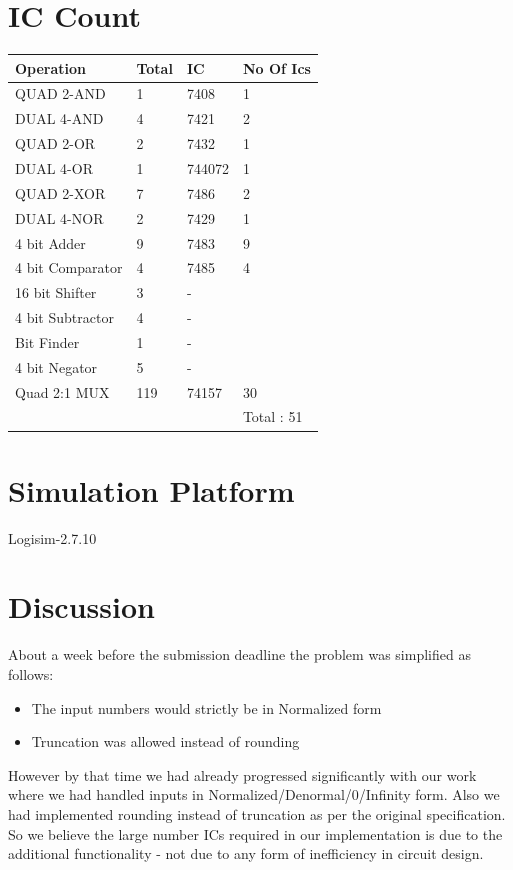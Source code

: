 \documentclass[12pt, a4paper]{article}
\begin{document}
	\section{IC Count}
	\begin{table}[H]
	\centering
\begin{tabular}{|l|l|l|l|} \hline
Operation        & Total & IC     & No Of Ics  \\ \hline
QUAD 2-AND       & 1     & 7408   & 1          \\ \hline
DUAL 4-AND       & 4     & 7421   & 2          \\ \hline
QUAD 2-OR        & 2     & 7432   & 1          \\ \hline
DUAL 4-OR        & 1     & 744072 & 1          \\ \hline
QUAD 2-XOR       & 7     & 7486   & 2          \\ \hline
DUAL 4-NOR       & 2     & 7429   & 1          \\ \hline
4 bit Adder      & 9     & 7483   & 9          \\ \hline
4 bit Comparator & 4     & 7485   & 4          \\ \hline
16 bit Shifter   & 3     & -      &            \\ \hline
4 bit Subtractor & 4     & -      &            \\ \hline
Bit Finder       & 1     & -      &            \\ \hline
4 bit Negator    & 5     & -      &            \\ \hline
Quad 2:1 MUX     & 119   & 74157  & 30         \\ \hline
                 &       &        & Total : 51 \\ \hline
\end{tabular}
\end{table}

	\section{Simulation Platform}
	Logisim-2.7.10
	\section{Discussion}
		About a week before the submission deadline the problem was simplified
		as follows:
		\begin{itemize}
			\item The input numbers would strictly be in Normalized form
			\item Truncation was allowed instead of rounding
		\end{itemize}
		However by that time we had already progressed significantly with our
		work where we had handled inputs in Normalized/Denormal/0/Infinity
		form. Also we had implemented rounding instead of truncation as per the
		original specification. So we believe the large number ICs required in
		our implementation is due to the additional functionality - not due to
		any form of inefficiency in circuit design.
		\newline
\end{document}
